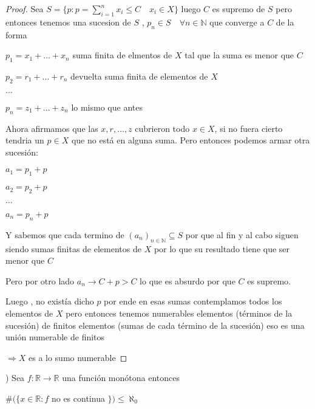 \documentclass[12pt]{article}
\newcommand{\n}{\aleph_{0}}
\newcommand{\R}{\mathbb{R}}
\newcommand{\N}{\mathbb{N}}
\newcommand{\Ra}{\Rightarrow}
\newcommand{\ra}{\rightarrow}
\theoremstyle{definition}
\begin{document}
\begin{proof}
  Sea $S = \{p : p = \sum_{i = 1}^{n} x_{i} \leq C \quad x_{i} \in X\}$ luego $C$ es supremo de $S$ pero entonces tenemos una sucesion de $S$ , $p_{n} \in S \quad \forall n \in \N$ que converge a $C$ de la forma

  $p_{1} = x_{1} + \dots + x_{n}$ suma finita de elmentos de $X$ tal que la suma es menor que $C$

  $p_{2} = r_{1} + \dots + r_{n} $ devuelta suma finita de elementos de $X$

  $\dots$

  $p_{n} = z_{1} + \dots + z_{n}$ lo mismo que antes

  Ahora afirmamos que las $x,r, \dots ,z $ cubrieron todo $x \in X$, si no fuera cierto tendria un $p \in X $ que no está en alguna suma. Pero entonces podemos armar otra sucesión: 
  
  $a_{1} = p_{1} + p$
  
  $a_{2}=   p_{2}+p$
  
  $\dots$
  
  $a_{n} = p_{n} + p$

  Y sabemos que cada termino de $(a_{n})_{n \in \N} \subseteq S$ por que al fin y al cabo siguen siendo sumas finitas de elementos de $X$ por lo que su resultado tiene que ser menor que $C$

  Pero por otro lado $a_{n} \ra C + p > C$ lo que es absurdo por que $C$ es supremo. 

  Luego , no existía dicho $p$ por ende en esas sumas contemplamos todos los elementos de $X$ pero entonces tenemos numerables elementos (términos de la sucesión) de finitos elementos (sumas de cada término de la sucesión) eso es una unión numerable de finitos 

  $\Ra X$ es a lo sumo numerable

\end{proof}

) Sea $f: \R \ra \R$ una función monótona entonces 
\begin{center} 
  $\# (\{x \in \R :f $ no es continua $\}) \leq \n$
\end{center}
\end{document}
